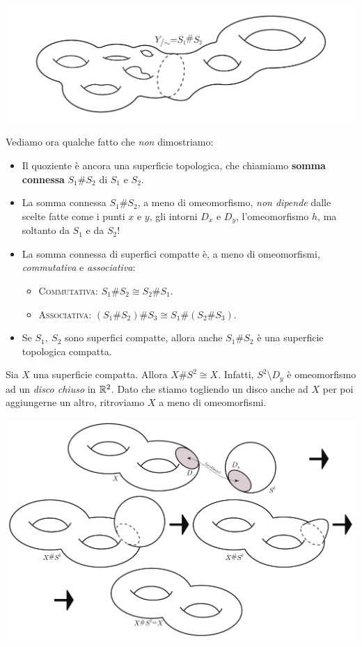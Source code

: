\begin{center}
	\includegraphics[trim=0cm 0cm 0cm 0cm, clip, scale=0.4]{images/connectedsum3.pdf}
\end{center}
Vediamo ora qualche fatto che \textit{non} dimostriamo:
	\begin{itemize}
		\item Il quoziente è ancora una superficie topologica, che chiamiamo \textbf{somma connessa} $S_1\# S_2$  di $S_1$ e $S_2$. 
		\item La somma connessa $S_1\# S_2$, a meno di omeomorfismo, \textit{non dipende} dalle scelte fatte come i punti $x$ e $y$, gli intorni $D_x$ e $D_y$, l'omeomorfismo $h$, ma soltanto da $S_1$ e da $S_2$!
		\item La somma connessa di superfici compatte è, a meno di omeomorfismi, \textit{commutativa} e \textit{associativa}:
		\begin{itemize}
			\item \textsc{Commutativa}: $S_1\# S_2\cong S_2\# S_1$.
			\item \textsc{Associativa}: $\left(S_1\# S_2\right)\# S_3\cong S_1\#\left(S_2\# S_3\right)$.
		\end{itemize}
	\item Se $S_1,\ S_2$ sono superfici compatte, allora anche $S_1\# S_2$ è una superficie topologica compatta.
	\end{itemize}
\begin{observe}
	Sia $X$ una superficie compatta. Allora $X\# S^2\cong X$. Infatti, $S^2\setminus D_y$ è omeomorfismo ad un \textit{disco chiuso} in $\mathbb{R}^2$. Dato che stiamo togliendo un disco anche ad $X$ per poi aggiungerne un altro, ritroviamo $X$ a meno di omeomorfismi.
	\begin{center}
		\includegraphics[trim=0cm 0cm 0cm 0cm, clip, scale=0.4]{images/connectedsumsphere.pdf}
	\end{center}
\vspace{-6mm}
\end{observe}

